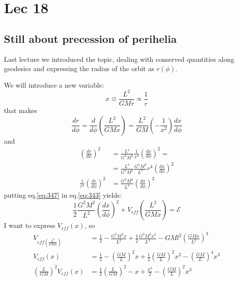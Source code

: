 \section{Lec 18}

\subsection{Still about precession of perihelia}
Last lecture we introduced the topic, dealing with conserved quantities along geodesics and expressing the radius of the orbit as $r\left( \phi  \right)$.\par
We will introduce a new variable:
\[
x \equiv \frac{L^{2}}{GMr} \propto \frac{1}{r} 
\]
that makes
\[
\frac{d r}{d \phi } = \frac{d }{d \phi } \left( \frac{L^{2}}{GMx} \right) = \frac{L^{2}}{GM} \left( - \frac{1}{x^{2}} \right) \frac{d x}{d \phi }
\]
and 
\begin{align}
	\left( \frac{d r}{d \phi } \right)^{2} &= \frac{L^{4}}{G^{2}M^{2}} \frac{1}{x^{4}} \left( \frac{d x}{d \phi } \right)^{2} = \nonumber \\
	&=\frac{L^{4}}{G^{2}M^{2}} \frac{G^{4}M^{4}}{L^{8}} r^{4} \left( \frac{d x}{d \phi } \right)^{2} \nonumber \\
	\frac{1}{r^{4}} \left( \frac{d r}{d \phi } \right)^{2} &= \frac{G^{2}M^{2}}{L^{4}} \left( \frac{d x}{d \phi } \right)^{2} \label{eq:347}
\end{align}
putting eq.\ref{eq:347} in eq.\ref{eq:343} yields:
\begin{equation}\label{eq:348}
\frac{1}{2} \frac{G^{2}M^{2}}{L^{2}} \left( \frac{d x}{d \phi } \right)^{2} + V_{eff}\left( \frac{L^{2}}{GMx} \right) = \mathcal{E}		
\end{equation}
I want to express $V_{eff}\left( x \right)$, so
\begin{align}
	V_{eff\left( \frac{L^{2}}{GMx} \right)} &= \frac{1}{2} - \frac{G^{2}M^{2}x}{L^{2}}+ \frac{1}{2} \frac{G^{2}M^{2}x^{2}}{L^{2}} - GMl^{2} \left( \frac{GMx}{L^{2}} \right)^{3} \nonumber \\
  V_{eff}\left( x \right) &= \frac{1}{2} - \left( \frac{GM}{L} \right)^{2}x +  \frac{1}{2}\left( \frac{GM}{L} \right)^{2}x^{2} - \left( \frac{GM}{L} \right)^{4}x^{3} \nonumber \\
  \left( \frac{L}{GM} \right)^{2} V_{eff}\left( x \right)  &= \frac{1}{2}\left( \frac{L}{GM} \right)^{2} - x + \frac{x^{2}}{2} - \left( \frac{GM}{L} \right)^{2}x^{3}
\end{align}

